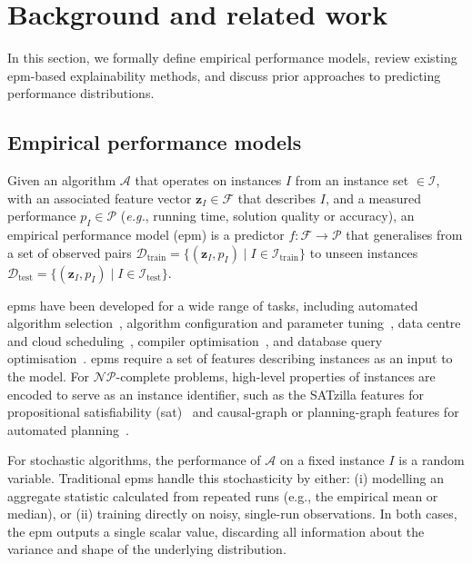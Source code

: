 \section{Background and related work}
\label{sec:bg}

In this section, we formally define empirical performance models, review existing \gls{epm}-based explainability methods, and discuss prior approaches to predicting performance distributions.

\subsection{Empirical performance models}
\label{sec:epm}

Given an algorithm $\mathcal{A}$ that operates on 
instances $I$ from an instance set $\in\mathcal{I}$, with an associated feature vector $\mathbf{z}_{I}\in\mathcal{F}$ that describes $I$, and a measured performance $p_I\in\mathcal{P}$ (\emph{e.g.}, running time, solution quality or accuracy), an empirical performance model (\gls{epm}) is a predictor 
$f: \mathcal{F} \to \mathcal{P}$ %
that generalises from a set of observed pairs $\mathcal{D}_\text{train}=\{(\mathbf{z}_{I},p_I) \mid I\in\mathcal{I}_\text{train}\}$ to unseen instances $\mathcal{D}_\text{test}=\{(\mathbf{z}_{I},p_I) \mid I\in\mathcal{I}_\text{test}\}$. 

\Glspl{epm} have been developed for a wide range of tasks, including automated algorithm selection~\citep{XuEtAl08, Kotthoff2016}, algorithm configuration and parameter tuning~\citep{HutEtAl12, HutEtAl06}, data centre and cloud scheduling~\citep{LeeEtAl25, IslEtAl12, SaxEtAl23, PhaEtAl20}, compiler optimisation~\citep{YotEtAl03, AshEtAl18}, and database query optimisation~\citep{WuEtAl20}. \Glspl{epm} require a set of features describing instances as an input to the model. For $\mathcal{NP}$-complete problems, high-level properties of instances are encoded to serve as an instance identifier, such as the SATzilla features for propositional satisfiability (\gls{sat})~\citep{HutEtAl14,ShaHoo24} and causal-graph or planning-graph features for automated planning~\citep{FawEtAl14}. 

For stochastic algorithms, the performance of $\mathcal{A}$ on a fixed instance $I$ is a random variable. Traditional \glspl{epm} handle this stochasticity by either: (i) modelling an aggregate statistic calculated from repeated runs (e.g., the empirical mean or median), or (ii) training directly on noisy, single-run observations. In both cases, the \gls{epm} outputs a single scalar value, discarding all information about the variance and shape of the underlying distribution.


